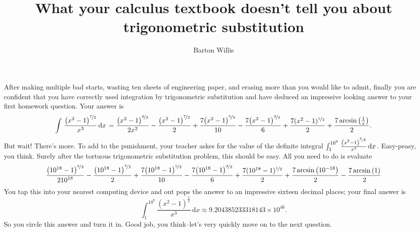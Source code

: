 \documentclass[12pt,fleqn]{article}
\title{What your calculus textbook doesn't tell you about trigonometric substitution}
\author{Barton Willis}
\newcounter{ex}\setcounter{ex}{0}
\begin{document}
\maketitle

After making multiple bad starts, wasting ten sheets of engineering paper, 
 and erasing more  than you would like to admit, finally you are confident 
 that you have correctly used integration by trigonometric substitution and have
 deduced an impressive looking answer to your first homework question. Your answer
 is
 \begin{equation*}
    \int {\left. \frac{{{\left( {{x}^{2}}-1\right) }^{\nicefrac{7}{2}}}}{{{x}^{3}}} \, \mathrm{d}x\right.}=\frac{{{\left( {{x}^{2}}-1\right) }^{\nicefrac{9}{2}}}}{2 {{x}^{2}}}-\frac{{{\left( {{x}^{2}}-1\right) }^{\nicefrac{7}{2}}}}{2}+\frac{7 {{\left( {{x}^{2}}-1\right) }^{\nicefrac{5}{2}}}}{10}-\frac{7 {{\left( {{x}^{2}}-1\right) }^{\nicefrac{3}{2}}}}{6}+\frac{7 (x^2-1)^{\nicefrac{1}{2}}}{2}+\frac{7 \operatorname{arcsin}\left( \frac{1}{x}\right) }{2}.
\end{equation*}
But wait! There's more. To add to the punishment, your teacher askes for the value of  
the definite integral $\int_1^{10^9} {\left. \frac{{{\left( {{x}^{2}}-1\right) }^{\nicefrac{7}{2}}}}{{{x}^{3}}} \, \mathrm{d}x\right.}$. Easy-peasy, you think.
Surely after the tortuous trigonometric substitution problem, this should be easy. 
All you need to do is evaluate
\begin{equation*}
  \frac{{{\left( {{10}^{18}}-1\right) }^{\nicefrac{9}{2}}}}{2 {{10}^{18}}}-\frac{{{\left( {{10}^{18}}-1\right) }^{\nicefrac{7}{2}}}}{2}+\frac{7 {{\left( {{10}^{18}}-1\right) }^{\nicefrac{5}{2}}}}{10}-\frac{7 {{\left( {{10}^{18}}-1\right) }^{\nicefrac{3}{2}}}}{6}+\frac{7 (10^{18}-1)^{\nicefrac{1}{2}}}{2}+\frac{7 \operatorname{arcsin}\left( 10^{-18}\right) }{2}
    - \frac{7 \operatorname{arcsin}\left( 1 \right) }{2}
\end{equation*}
You tap this into your nearest computing device and out  pops the answer to an 
impressive sixteen decimal places; your final answer is
\begin{equation*}
    \int_1^{10^9} {\left. \frac{{{\left( {{x}^{2}}-1\right) }^{\frac{7}{2}}}}{{{x}^{3}}} \, \mathrm{d}x\right.}
       \approx 9.204385233318143 \times {{10}^{46}}.
\end{equation*}
So you circle this answer and turn it in. Good job, you think--let's very quickly move on to the 
next question.
\end{document}
